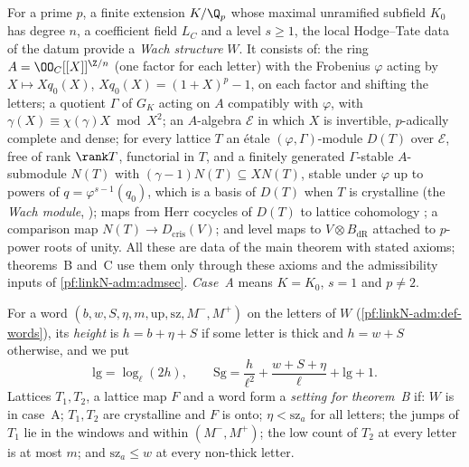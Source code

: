 \begin{remark}\label{pf:linkN-adm:wach}
For a prime $p$, a finite extension $K/\Q_p$ whose maximal unramified subfield $K_0$ has degree $n$, a coefficient
field $L_C$ and a level $s\ge1$, the local Hodge--Tate data of the datum provide a \emph{Wach structure} $W$. It consists
of: the ring $A=\OO_C[[X]]^{\Z/n}$ (one factor for each letter) with the Frobenius $\varphi$ acting by $X\mapsto
Xq_0(X)$, $Xq_0(X)=(1+X)^p-1$, on each factor and shifting the letters; a quotient $\Gamma$ of $G_K$ acting on $A$
compatibly with $\varphi$, with $\gamma(X)\equiv\chi(\gamma)X\bmod X^2$; an $A$-algebra $\mathcal E$ in which $X$ is
invertible, $p$-adically complete and dense; for every lattice $T$ an \'etale $(\varphi,\Gamma)$-module $D(T)$ over
$\mathcal E$, free of rank $\rank T$, functorial in $T$, and a finitely generated $\Gamma$-stable $A$-submodule $N(T)$ with
$(\gamma-1)N(T)\subseteq XN(T)$, stable under $\varphi$ up to powers of $q=\varphi^{s-1}(q_0)$, which is a basis of $D(T)$
when $T$ is crystalline (the \emph{Wach module}, \cite{Wach1996,Berger2004}); maps from Herr cocycles of $D(T)$ to lattice
cohomology \cite{Herr1998}; a comparison map $N(T)\to D_{\mathrm{cris}}(V)$; and level maps to $V\otimes B_{\mathrm{dR}}$
attached to $p$-power roots of unity. All these are data of the main theorem with stated axioms; theorems~B and~C use
them only through these axioms and the admissibility inputs of \cref{pf:linkN-adm:admsec}. \emph{Case~A} means
$K=K_0$, $s=1$ and $p\ne2$.
\end{remark}

For a word $(b,w,S,\eta,m,\mathrm{up},\mathrm{sz},M^-,M^+)$ on the letters of $W$ (\cref{pf:linkN-adm:def-words}), its
\emph{height} is $h=b+\eta+S$ if some letter is thick and $h=w+S$ otherwise, and we put
\begin{equation}\label{pf:linkN-adm:eq-Sg}
\mathrm{lg}=\log_\ell(2h),\qquad \mathrm{Sg}=\frac h{\ell^2}+\frac{w+S+\eta}{\ell}+\mathrm{lg}+1 .
\end{equation}
Lattices $T_1,T_2$, a lattice map $F$ and a word form a \emph{setting for theorem~B} if: $W$ is in case~A; $T_1,T_2$ are crystalline
and $F$ is onto; $\eta<\mathrm{sz}_a$ for all letters; the jumps of $T_1$ lie in the windows and within $(M^-,M^+)$; the low
count of $T_2$ at every letter is at most $m$; and $\mathrm{sz}_a\le w$ at every non-thick letter.


